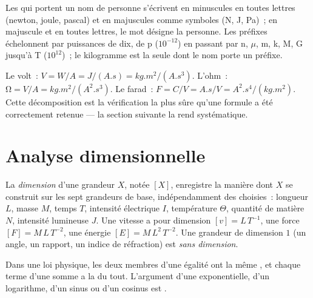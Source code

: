 \begin{remark}\label{rem:b1:units-dimensions:names}
Les  qui portent un nom de personne s'écrivent en minuscules en
toutes lettres (newton, joule, pascal) et en majuscules comme symboles
(\unit{N}, \unit{J}, \unit{Pa})~; en majuscule et en toutes lettres, le
mot désigne la personne. Les préfixes échelonnent par puissances de dix,
de p ($10^{-12}$) en passant par n, $\mu$, m, k, M, G jusqu'à T
($10^{12}$)~; le kilogramme est la seule  dont le nom porte
un préfixe.
\end{remark}

\begin{example}\label{ex:b1:units-dimensions:unpack}
Le volt~: $\unit{V} = \unit{W/A} = \unit{J/(A.s)} = \unit{kg.m^2/(A.s^3)}$.
L'ohm~: $\unit{\ohm} = \unit{V/A} = \unit{kg.m^2/(A^2.s^3)}$. Le farad~:
$\unit{F} = \unit{C/V} = \unit{A.s/V} = \unit{A^2.s^4/(kg.m^2)}$. Cette
décomposition est la vérification la plus sûre qu'une formule a été
correctement retenue --- la section suivante la rend systématique.
\end{example}

\section{Analyse dimensionnelle}

\begin{definition}[Dimension]\label{def:b1:units-dimensions:dimension}
La \emph{dimension} d'une grandeur $X$, notée $[X]$, enregistre la
manière dont $X$ se construit sur les sept grandeurs de base,
indépendamment des  choisies~: longueur $L$, masse $M$, temps $T$,
intensité électrique $I$, température $\Theta$, quantité de matière $N$,
intensité lumineuse $J$. Une vitesse a pour dimension
$[v] = L\,T^{-1}$, une force $[F] = M\,L\,T^{-2}$, une énergie
$[E] = M\,L^2\,T^{-2}$. Une grandeur de dimension $1$ (un angle, un
rapport, un indice de réfraction) est \emph{sans dimension}.
\end{definition}

\begin{theorem}\label{thm:b1:units-dimensions:homogeneity}
Dans une loi physique, les deux membres d'une égalité ont la même
, et chaque terme d'une somme a la  du tout.
L'argument d'une exponentielle, d'un logarithme, d'un sinus ou d'un
cosinus est .
\end{theorem}

